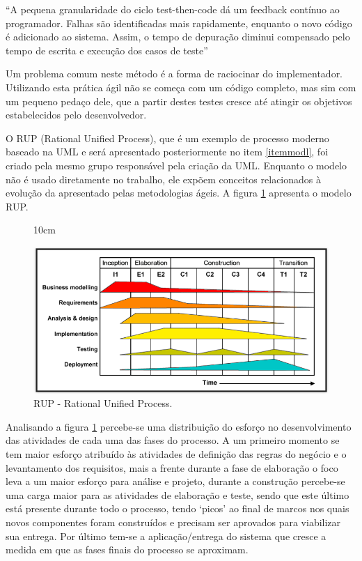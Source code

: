``A pequena granularidade do ciclo test-then-code dá um feedback contínuo ao programador. Falhas são identificadas mais rapidamente, enquanto o novo código é
adicionado ao sistema. Assim, o tempo de depuração diminui compensado pelo tempo de escrita e execução dos casos de teste'' \cite[p.4]{borges2006conceitos}

Um problema comum neste método é a forma de raciocinar do implementador. Utilizando esta prática ágil não se começa com um código completo, mas sim com um pequeno pedaço dele, que a partir destes testes cresce até atingir os objetivos estabelecidos pelo desenvolvedor. 

O RUP (Rational Unified Process), que é um exemplo de processo moderno baseado na UML e será apresentado posteriormente no item \ref{itemmodl}, foi criado pela mesmo grupo responsável pela criação da UML. Enquanto o modelo não é usado diretamente no trabalho, ele expõem conceitos relacionados à evolução da apresentado pelas metodologias ágeis. A figura \ref{RUP} apresenta o modelo RUP.

\begin{figure}[!ht]{10cm}
  \caption{RUP - Rational Unified Process.} \label{RUP}
  \includegraphics[width=1\hsize]{figuras/rup.png}
\end{figure}

Analisando a figura \ref{RUP} percebe-se uma distribuição do esforço no desenvolvimento das atividades de cada uma das fases do processo. A um primeiro momento se tem maior esforço atribuído às atividades de definição das regras do negócio e o levantamento dos requisitos, mais a frente durante a fase de elaboração o foco leva a um maior esforço para análise e projeto, durante a construção percebe-se uma carga maior para as atividades de elaboração e teste, sendo que este último está presente durante todo o processo, tendo `picos' ao final de marcos nos quais novos componentes foram construídos e precisam ser aprovados para viabilizar sua entrega. Por último tem-se a aplicação/entrega do sistema que cresce a medida em que as fases finais do processo se aproximam.



